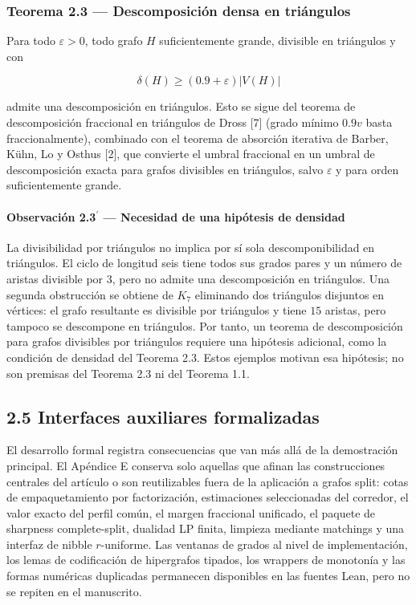 \documentclass[spanish,11pt,a4paper]{article}
\begin{document}
\subsubsection{Teorema 2.3 --- Descomposición densa en
triángulos}\label{teorema-2.3-descomposiciuxf3n-densa-en-triuxe1ngulos}

Para todo \(\varepsilon>0\), todo grafo \(H\) suficientemente grande,
divisible en triángulos y con

\[
\delta(H)\ge(0.9+\varepsilon)|V(H)|
\]

admite una descomposición en triángulos. Esto se sigue del teorema de
descomposición fraccional en triángulos de Dross {[}7{]} (grado mínimo
\(0.9v\) basta fraccionalmente), combinado con el teorema de absorción
iterativa de Barber, Kühn, Lo y Osthus {[}2{]}, que convierte el umbral
fraccional en un umbral de descomposición exacta para grafos divisibles
en triángulos, salvo \(\varepsilon\) y para orden suficientemente
grande.

\paragraph{\texorpdfstring{Observación 2.3\(^{\prime}\) --- Necesidad de
una hipótesis de
densidad}{Observación 2.3\^{}\{\textbackslash prime\} --- Necesidad de una hipótesis de densidad}}\label{observaciuxf3n-2.3prime-necesidad-de-una-hipuxf3tesis-de-densidad}

La divisibilidad por triángulos no implica por sí sola descomponibilidad
en triángulos. El ciclo de longitud seis tiene todos sus grados pares y
un número de aristas divisible por \(3\), pero no admite una
descomposición en triángulos. Una segunda obstrucción se obtiene de
\(K_7\) eliminando dos triángulos disjuntos en vértices: el grafo
resultante es divisible por triángulos y tiene \(15\) aristas, pero
tampoco se descompone en triángulos. Por tanto, un teorema de
descomposición para grafos divisibles por triángulos requiere una
hipótesis adicional, como la condición de densidad del Teorema 2.3.
Estos ejemplos motivan esa hipótesis; no son premisas del Teorema 2.3 ni
del Teorema 1.1.

\subsection{2.5 Interfaces auxiliares
formalizadas}\label{interfaces-auxiliares-formalizadas}

El desarrollo formal registra consecuencias que van más allá de la
demostración principal. El Apéndice E conserva solo aquellas que afinan
las construcciones centrales del artículo o son reutilizables fuera de
la aplicación a grafos split: cotas de empaquetamiento por
factorización, estimaciones seleccionadas del corredor, el valor exacto
del perfil común, el margen fraccional unificado, el paquete de
sharpness complete-split, dualidad LP finita, limpieza mediante
matchings y una interfaz de nibble \(r\)-uniforme. Las ventanas de
grados al nivel de implementación, los lemas de codificación de
hipergrafos tipados, los wrappers de monotonía y las formas numéricas
duplicadas permanecen disponibles en las fuentes Lean, pero no se
repiten en el manuscrito.
\end{document}
